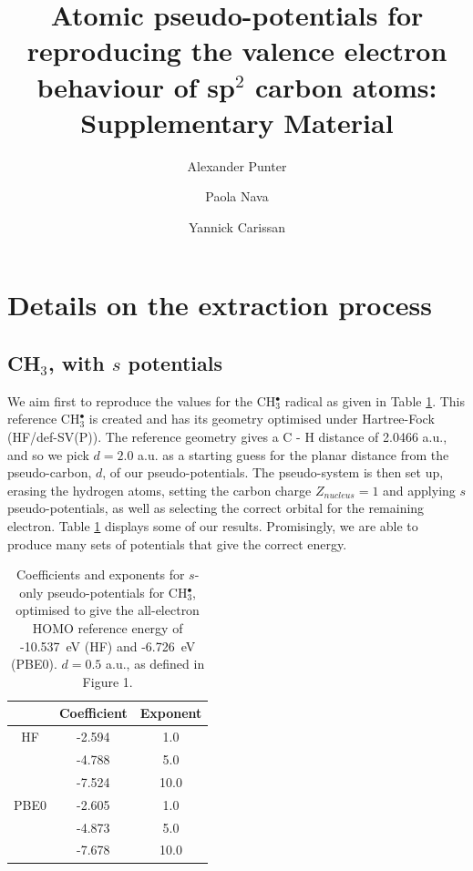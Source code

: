 \documentclass[aip]{revtex4-1}
\begin{document}
\renewcommand{\thetable}{S-\Roman{table}}
\renewcommand{\thefigure}{S-\Roman{figure}}

\title{Atomic pseudo-potentials for reproducing the valence electron behaviour of sp$^2$ carbon atoms: Supplementary Material}
\author{Alexander Punter}
\author{Paola Nava}
\author{Yannick Carissan}

\maketitle

\tableofcontents

\section*{Details on the extraction process}
\subsection*{CH\(_{3}\), with \(s\) potentials}

We aim first to reproduce the values for the CH\(^{\bullet}_{3}\) radical as given in Table \ref{table:ch3_s_potentials}. 
This reference CH\(^{\bullet}_{3}\) is created and has its geometry optimised under Hartree-Fock (HF/def-SV(P)). The reference geometry gives a C - H distance of 2.0466 a.u., and so we pick \(d = 2.0\) a.u. as a starting guess for the planar distance from the pseudo-carbon, \(d\), of our pseudo-potentials. The pseudo-system is then set up, erasing the hydrogen atoms, setting the carbon charge \(Z_{nucleus} = 1\) and applying \(s\) pseudo-potentials, as well as selecting the correct orbital for the remaining electron. Table \ref{table:ch3_s_potentials} displays some of our results. Promisingly, we are able to produce many sets of potentials that give the correct energy.

\begin{table}[ht]
\begin{tabular}{c c c}
\hline\hline
 & Coefficient & Exponent \\ 
\hline
HF & -2.594 & 1.0 \\
 & -4.788 & 5.0 \\
 & -7.524 & 10.0 \\
\hline
PBE0 & -2.605 & 1.0 \\
 & -4.873 & 5.0 \\
 & -7.678 & 10.0 \\
\hline\hline
\end{tabular}
\caption{Coefficients and exponents for \(s\)-only pseudo-potentials for CH\(^{\bullet}_{3}\), optimised to give 
the all-electron HOMO reference energy of  -10.537~eV (HF) and -6.726~eV (PBE0). 
\(d = 0.5\) a.u., as defined in Figure 1.}
\label{table:ch3_s_potentials}
\end{table}
\end{document}
